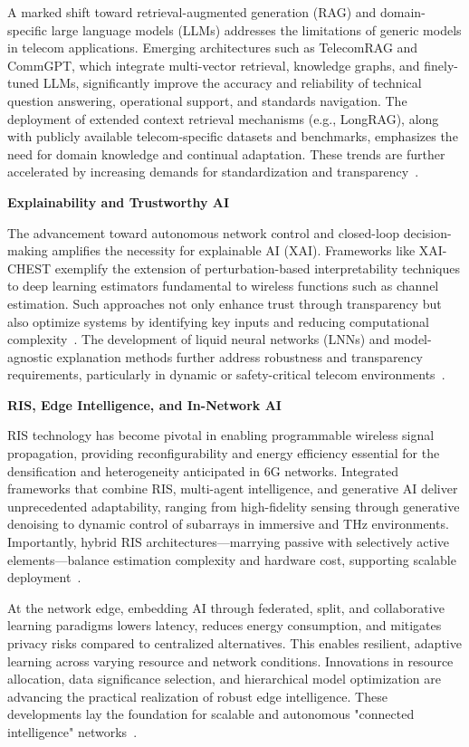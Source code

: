\documentclass[11pt]{article}
\begin{document}
A marked shift toward retrieval-augmented generation (RAG) and domain-specific large language models (LLMs) addresses the limitations of generic models in telecom applications. Emerging architectures such as TelecomRAG and CommGPT, which integrate multi-vector retrieval, knowledge graphs, and finely-tuned LLMs, significantly improve the accuracy and reliability of technical question answering, operational support, and standards navigation. The deployment of extended context retrieval mechanisms (e.g., LongRAG), along with publicly available telecom-specific datasets and benchmarks, emphasizes the need for domain knowledge and continual adaptation. These trends are further accelerated by increasing demands for standardization and transparency~\cite{ref13, ref14, ref15, ref16, ref17, ref18, ref19, ref20}.

\textbf{Explainability and Trustworthy AI}

The advancement toward autonomous network control and closed-loop decision-making amplifies the necessity for explainable AI (XAI). Frameworks like XAI-CHEST exemplify the extension of perturbation-based interpretability techniques to deep learning estimators fundamental to wireless functions such as channel estimation. Such approaches not only enhance trust through transparency but also optimize systems by identifying key inputs and reducing computational complexity~\cite{ref43, ref44, ref45, ref46, ref47, ref48, ref49}. The development of liquid neural networks (LNNs) and model-agnostic explanation methods further address robustness and transparency requirements, particularly in dynamic or safety-critical telecom environments~\cite{ref43}.

\textbf{RIS, Edge Intelligence, and In-Network AI}

RIS technology has become pivotal in enabling programmable wireless signal propagation, providing reconfigurability and energy efficiency essential for the densification and heterogeneity anticipated in 6G networks. Integrated frameworks that combine RIS, multi-agent intelligence, and generative AI deliver unprecedented adaptability, ranging from high-fidelity sensing through generative denoising to dynamic control of subarrays in immersive and THz environments. Importantly, hybrid RIS architectures—marrying passive with selectively active elements—balance estimation complexity and hardware cost, supporting scalable deployment~\cite{ref28, ref29, ref30, ref31, ref32, ref33, ref34}.

At the network edge, embedding AI through federated, split, and collaborative learning paradigms lowers latency, reduces energy consumption, and mitigates privacy risks compared to centralized alternatives. This enables resilient, adaptive learning across varying resource and network conditions. Innovations in resource allocation, data significance selection, and hierarchical model optimization are advancing the practical realization of robust edge intelligence. These developments lay the foundation for scalable and autonomous "connected intelligence" networks~\cite{ref35, ref36, ref37, ref38, ref39, ref40, ref41, ref42}.
\end{document}

